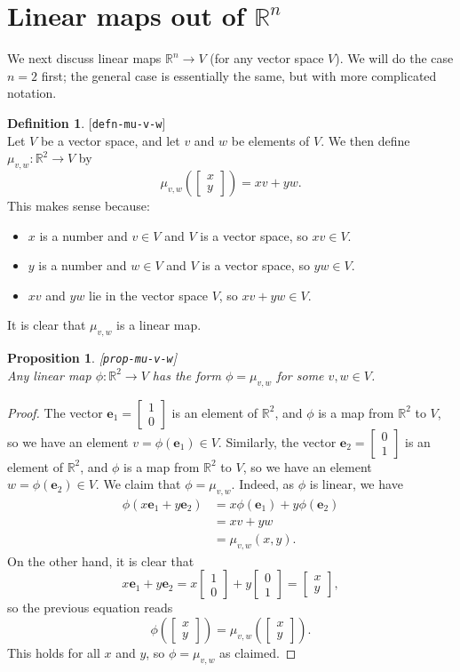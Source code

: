 \documentclass{amsart}
\newcommand{\lbl}[1]{\label{#1}\textup{[\texttt{#1}]}\ \\}
\newcommand{\lbl}{\label}
\newcommand{\R}         {{\mathbb{R}}}
\newcommand{\bsm}       {\left[\begin{smallmatrix}}
\newcommand{\esm}       {\end{smallmatrix}\right]}
\newcommand{\xra}       {\xrightarrow}
\newcommand{\ve}        {\mathbf{e}}
\renewcommand{\:}       {\colon}
\newtheorem{proposition}[theorem]{Proposition}
\theoremstyle{definition}
\newtheorem{definition}[theorem]{Definition}
\begin{document}
\section{Linear maps out of $\R^n$}
\label{sec-Rn-maps}

We next discuss linear maps $\R^n\xra{}V$ (for any vector space $V$).
We will do the case $n=2$ first; the general case is essentially the
same, but with more complicated notation.
\begin{definition}\lbl{defn-mu-v-w}
 Let $V$ be a vector space, and let $v$ and $w$ be elements of $V$.
 We then define $\mu_{v,w}\:\R^2\xra{}V$ by
 \[ \mu_{v,w}\left(\bsm x\\ y\esm\right) = xv+yw. \]
 This makes sense because:
 \begin{itemize}
  \item $x$ is a number and $v\in V$ and $V$ is a vector space, so
    $xv\in V$.
  \item $y$ is a number and $w\in V$ and $V$ is a vector space, so
    $yw\in V$.
  \item $xv$ and $yw$ lie in the vector space $V$, so $xv+yw\in V$.
 \end{itemize}
 It is clear that $\mu_{v,w}$ is a linear map.
\end{definition}

\begin{proposition}\lbl{prop-mu-v-w}
 Any linear map $\phi\:\R^2\xra{}V$ has the form $\phi=\mu_{v,w}$ for
 some $v,w\in V$.
\end{proposition}
\begin{proof}
 The vector $\ve_1=\bsm 1\\0\esm$ is an element of $\R^2$, and
 $\phi$ is a map from $\R^2$ to $V$, so we have an element
 $v=\phi(\ve_1)\in V$.  Similarly, the vector
 $\ve_2=\bsm 0\\1\esm$ is an element of $\R^2$, and $\phi$
 is a map from $\R^2$ to $V$, so we have an element
 $w=\phi(\ve_2)\in V$.  We claim that $\phi=\mu_{v,w}$.
 Indeed, as $\phi$ is linear, we have
 \begin{align*}
  \phi(x\ve_1+y\ve_2) &= x\phi(\ve_1) + y\phi(\ve_2) \\
                  &= xv+yw \\
                  &= \mu_{v,w}(x,y).
 \end{align*}
 On the other hand, it is clear that 
 \[ x\ve_1 + y\ve_2 = x\bsm 1\\0\esm + y\bsm 0\\1\esm =
     \bsm x\\ y\esm,
 \]
 so the previous equation reads
 \[ \phi\left(\bsm x\\y\esm\right) =
    \mu_{v,w}\left(\bsm x\\ y\esm\right).
 \]
 This holds for all $x$ and $y$, so $\phi=\mu_{v,w}$ as claimed.
\end{proof}
\end{document}
